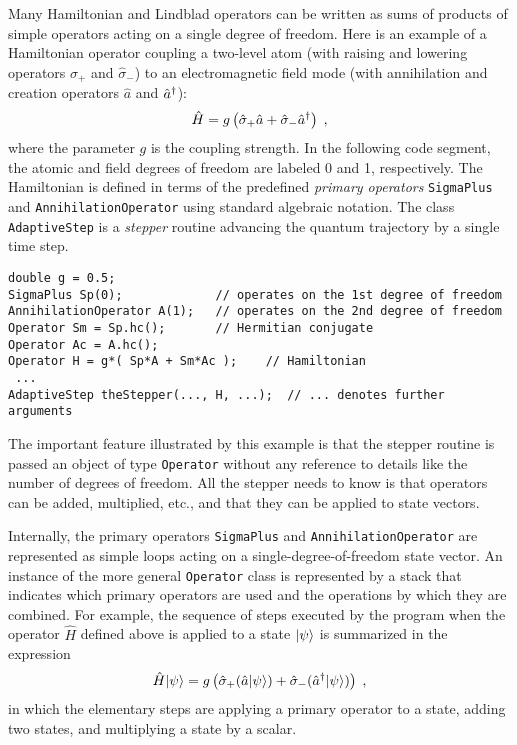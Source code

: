 Many Hamiltonian and Lindblad operators can be written as
sums of products of simple operators acting on a single degree of
freedom. Here is an example of a Hamiltonian operator coupling a two-level
atom (with raising and lowering operators $\hat\sigma_+$ and $\hat\sigma_-$) to
an electromagnetic field mode (with annihilation and creation operators 
$\hat a$ and $\hat a^\dagger$):
\begin{equation}
\hat H = g\left(\hat\sigma_+ \hat a + \hat\sigma_- \hat a^\dagger \right) \;,
\end{equation}
where the parameter $g$ is the coupling strength.
In the following code segment, the atomic and field degrees of freedom are
labeled 0 and 1, respectively. The Hamiltonian is defined in terms of the
predefined {\it primary operators\/} {\tt SigmaPlus} and
{\tt AnnihilationOperator} using standard algebraic notation. The class
{\tt AdaptiveStep} is a {\it stepper\/} routine advancing the quantum trajectory
by a single time step.
\begin{verbatim}
double g = 0.5;
SigmaPlus Sp(0);             // operates on the 1st degree of freedom
AnnihilationOperator A(1);   // operates on the 2nd degree of freedom
Operator Sm = Sp.hc();       // Hermitian conjugate
Operator Ac = A.hc();
Operator H = g*( Sp*A + Sm*Ac );    // Hamiltonian
 ...
AdaptiveStep theStepper(..., H, ...);  // ... denotes further arguments
\end{verbatim}
The important feature illustrated by this example is that the
stepper routine is passed an object of type {\tt Operator} without any
reference to details like the number of degrees of freedom. 
All the stepper needs to know is that operators can be added, multiplied,
etc., and that they can be applied to state vectors.

Internally, the primary operators {\tt SigmaPlus} and
{\tt AnnihilationOperator} are represented as simple loops acting on a
single-degree-of-freedom state vector. An instance of the more general
{\tt Operator} class is represented by a stack that indicates which
primary operators are used and the operations by which they are combined.
For example, the sequence of steps executed by the program when the operator
$\hat H$ defined above is applied to a state $| \psi \rangle$ is summarized in the 
expression
\begin{equation}
\hat H | \psi \rangle = g\left(\hat\sigma_+(\hat a| \psi \rangle)
        + \hat\sigma_-(\hat a^\dagger| \psi \rangle) \right) \;,
\end{equation}
in which the  elementary steps are applying a primary operator to a state,
adding two states, and multiplying a state by a scalar. 

